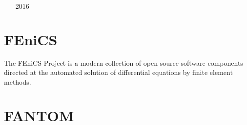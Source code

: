 \begin{small}
\begin{itemize}
\item[2016] \textcite{rogj16}
\end{itemize}
\end{small}

\section{FEniCS} 

The FEniCS Project is a modern collection of open source
software components directed at the automated solution of
differential equations by finite element methods.

\begin{small}
\begin{itemize}
\item[\twothousandthirteen]  \textcite{vyrc13}
\item[\twothousandfourteen]  \textcite{alrk14}
\item[\twothousandseventeen] \textcite{jidb17}
\item[\twothousandtwenty]    \textcite{resi20}
\item[\twothousandtwentyone] \textcite{josv21}
\end{itemize}
\end{small}


\section{FANTOM}

